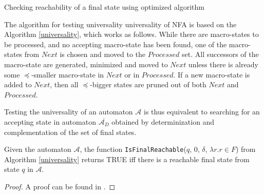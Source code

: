 \begin{algorithm}[ht!]
		\BlankLine
		\BlankLine
		\caption{Checking reachability of a
		final state using optimized algorithm\cite{tacas}}\label{universality}
	\end{algorithm}
	
The algorithm for testing universality universality of NFA is based on the
Algorithm \ref{universality}, which works as follows.
While there are macro-states to be processed, and no accepting macro-state has
been found, one of the macro-states from $\mathit{Next}$ is chosen and moved to
the $\mathit{Processed}$ set. All successors of the macro-state are generated,
minimized and moved to $\mathit{Next}$ unless there is already some
$\preceq$-smaller macro-state in $\mathit{Next}$ or in $\mathit{Processed}$. If
a new macro-state is added to $\mathit{Next}$, then all $\preceq$-bigger states
are pruned out of both $\mathit{Next}$ and $\mathit{Processed}$.

Testing the universality of an automaton $\mathcal{A}$ is thus equivalent to
searching for an accepting state in automaton $\overline{\mathcal{A}_D}$
obtained by determinization and complementation of the set of final states.
	
\begin{lemma}\label{search-is-correct}
 Given the automaton $\mathcal{A}$, the function
 \texttt{IsFinalReachable}($q$, $0$, $\delta$, $\lambda r. r \in F$) from
 Algorithm \ref{universality} returns \textsc{TRUE} iff there is a reachable
 final state from state $q$ in $\mathcal{A}$.
\end{lemma}
\begin{proof}
 A proof can be found in \cite{raskin}.
\end{proof}

